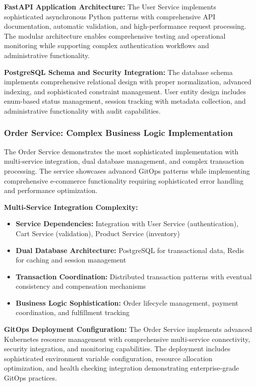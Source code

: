 \textbf{FastAPI Application Architecture:}
The User Service implements sophisticated asynchronous Python patterns with comprehensive API documentation, automatic validation, and high-performance request processing. The modular architecture enables comprehensive testing and operational monitoring while supporting complex authentication workflows and administrative functionality.

\textbf{PostgreSQL Schema and Security Integration:}
The database schema implements comprehensive relational design with proper normalization, advanced indexing, and sophisticated constraint management. User entity design includes enum-based status management, session tracking with metadata collection, and administrative functionality with audit capabilities.

\subsubsection{Order Service: Complex Business Logic Implementation}

The Order Service demonstrates the most sophisticated implementation with multi-service integration, dual database management, and complex transaction processing. The service showcases advanced GitOps patterns while implementing comprehensive e-commerce functionality requiring sophisticated error handling and performance optimization.

\textbf{Multi-Service Integration Complexity:}
\begin{itemize}
\item \textbf{Service Dependencies:} Integration with User Service (authentication), Cart Service (validation), Product Service (inventory)
\item \textbf{Dual Database Architecture:} PostgreSQL for transactional data, Redis for caching and session management
\item \textbf{Transaction Coordination:} Distributed transaction patterns with eventual consistency and compensation mechanisms
\item \textbf{Business Logic Sophistication:} Order lifecycle management, payment coordination, and fulfillment tracking
\end{itemize}

\textbf{GitOps Deployment Configuration:}
The Order Service implements advanced Kubernetes resource management with comprehensive multi-service connectivity, security integration, and monitoring capabilities. The deployment includes sophisticated environment variable configuration, resource allocation optimization, and health checking integration demonstrating enterprise-grade GitOps practices.

